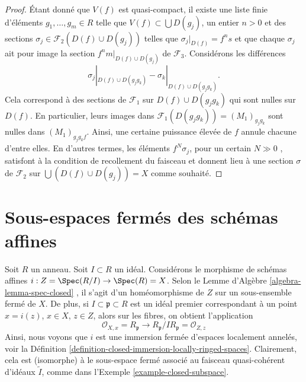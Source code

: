 \begin{proof}
\medskip\noindent
Étant donné que  $V(f)$  est quasi-compact, il existe une liste finie
d'éléments  $g_1, \ldots, g_m \in R$  telle que  $V(f) \subset \bigcup D(g_j)$, un entier  $n > 0$  et des
sections  $\sigma_j \in \mathcal{F}_2(D(f) \cup D(g_j))$  telles que  $\sigma_j|_{D(f)} = f^n s$  et que chaque  $\sigma_j$  ait pour image la
section  $f^nm|_{D(f) \cup D(g_j)}$  de  $\mathcal{F}_3$. Considérons les différences
$$
\sigma_j|_{D(f) \cup D(g_jg_k)}
-
\sigma_k|_{D(f) \cup D(g_jg_k)}.
$$
Cela correspond à des sections de  $\mathcal{F}_1$  sur  $D(f) \cup D(g_jg_k)$  qui sont nulles
sur  $D(f)$. En particulier, leurs images dans  $\mathcal{F}_1(D(g_jg_k)) = (M_1)_{g_jg_k}$  sont nulles dans
 $(M_1)_{g_jg_kf}$. Ainsi, une certaine puissance élevée de  $f$  annule chacune
d'entre elles. En d'autres termes, les éléments  $f^N \sigma_j$, pour un certain
 $N \gg 0$ , satisfont à la condition de recollement du faisceau et
donnent lieu à une section  $\sigma $  de  $\mathcal{F}_2$  sur  $\bigcup (D(f) \cup D(g_j)) = X$  comme
souhaité.
\end{proof}







\section{Sous-espaces fermés des schémas affines}
\label{section-closed-in-affine}

\begin{example}
\label{example-closed-immersion-affines}
Soit  $R$  un anneau. Soit  $I \subset R$  un idéal. Considérons le morphisme
de schémas affines  $i : Z = \Spec(R/I) \to \Spec(R) = X$. Selon le Lemme d'Algèbre  \ref{algebra-lemma-spec-closed} , il s'agit
d'un homéomorphisme de  $Z$  sur un sous-ensemble fermé de  $X$. De
plus, si  $I \subset \mathfrak p \subset R$  est un idéal premier correspondant à un point  $x = i(z)$,
 $x \in X$,  $z \in Z$, alors sur les fibres, on obtient l'application
$$
\mathcal{O}_{X, x} = R_{\mathfrak p}
\longrightarrow
R_{\mathfrak p}/IR_{\mathfrak p} = \mathcal{O}_{Z, z}
$$
Ainsi, nous voyons que  $i$  est une immersion fermée d'espaces localement
annelés, voir la Définition  \ref{definition-closed-immersion-locally-ringed-spaces}. Clairement, cela est (isomorphe) à
le sous-espace fermé associé au faisceau quasi-cohérent d'idéaux  $\widetilde I$, comme
dans l'Exemple  \ref{example-closed-subspace}.
\end{example}

